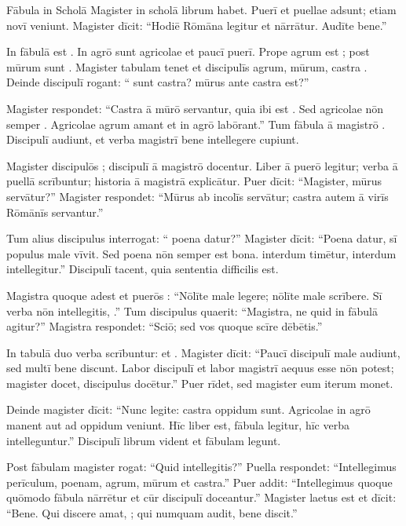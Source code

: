 \documentclass[12pt]{nextbook}
\begin{document}
\begin{readersection}{Fābula in Scholā}
Magister in scholā librum habet. Puerī et puellae adsunt; etiam  novī veniunt. Magister dīcit: “Hodiē  Rōmāna legitur et nārrātur. Audīte bene.”

In fābulā est . In agrō sunt agricolae et paucī puerī. Prope agrum est ; post mūrum sunt . Magister tabulam tenet et discipulīs agrum, mūrum, castra . Deinde discipulī rogant: “ sunt castra?  mūrus ante castra est?”

Magister respondet: “Castra ā mūrō servantur, quia ibi est . Sed agricolae nōn semper . Agricolae agrum amant et in agrō labōrant.” Tum fābula ā magistrō . Discipulī audiunt, et verba magistrī bene intellegere cupiunt.

Magister discipulōs ; discipulī ā magistrō docentur. Liber ā puerō legitur; verba ā puellā scrībuntur; historia ā magistrā explicātur. Puer dīcit: “Magister,  mūrus servātur?” Magister respondet: “Mūrus ab incolīs servātur; castra autem ā virīs Rōmānīs servantur.”

Tum alius discipulus interrogat: “ poena datur?” Magister dīcit: “Poena datur, sī populus male vīvit. Sed poena nōn semper est bona.  interdum timētur, interdum intellegitur.” Discipulī tacent, quia sententia difficilis est.

Magistra quoque adest et puerōs : “Nōlīte male legere; nōlīte male scrībere. Sī verba nōn intellegitis, .” Tum discipulus quaerit: “Magistra, ne quid in fābulā agitur?” Magistra respondet: “Sciō; sed vos quoque scīre dēbētis.”

In tabulā duo verba scrībuntur:  et . Magister dīcit: “Paucī discipulī male audiunt, sed multī bene discunt. Labor discipulī et labor magistrī aequus esse nōn potest; magister docet, discipulus docētur.” Puer rīdet, sed magister eum iterum monet.

Deinde magister dīcit: “Nunc legite: castra  oppidum sunt. Agricolae  in agrō manent aut ad oppidum veniunt. Hīc liber est,  fābula legitur, hīc verba intelleguntur.” Discipulī librum vident et fābulam legunt.

Post fābulam magister rogat: “Quid intellegitis?” Puella respondet: “Intellegimus perīculum, poenam, agrum, mūrum et castra.” Puer addit: “Intellegimus quoque quōmodo fābula nārrētur et cūr discipulī doceantur.” Magister laetus est et dīcit: “Bene. Qui discere amat, ; qui numquam audit,  bene discit.”

\end{readersection}
\end{document}
